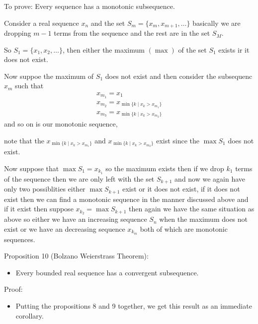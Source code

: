 \documentclass[12pt,a4paper]{article}
\begin{document}
\begin{tcolorbox}
    To prove: Every sequence has a monotonic subsequence.

    Consider a real sequence \(x_{n}\) and the set \(S_{m}=\{x_{m},x_{m+1},\ldots \} \) basically we are dropping \(m-1\) terms from the sequence and the rest are in the set \(S_{M}\).
    
    So \(S_{1}=\{x_{1},x_{2},\ldots \} \), then either the maximum \(\left( \max \right) \) of the set \(S_{1}\) exists ir it does not exist.
    
    Now suppoe the maximum of \(S_{1}\) does not exist and then consider the subsequenc \(x_{m}\) such that
     \begin{align*}
        x_{m_{1}}= x_{1}\\
        x_{m_{2}}= x_{\min \{k \mid x_{k} > x_{m_{1}}\}}\\
        x_{m_{3}}= x_{\min \{k \mid x_{k} > x_{m_{2}}\}}
    \end{align*}   
    and so on is our monotonic sequence,
    
    note that the \(x_{\min \{k \mid x_{k} > x_{m_{1}}\}}\) and \(x_{\min \{k \mid x_{k} > x_{m_{2}}\}}\)   exist since the \(\max S_{1} \) does not exist. 
    
    Now suppose that \(\max S_{1}=x_{k_{1}}\) so the maximum exists then if we drop \(k_{1}\) terms of the sequence then we are only left with the set \(S_{k+1}\) and now we again have only two possiblities either \(\max S_{k+1}\) exist or it does not exist, if it does not exist then we can find a monotonic sequence in the manner discussed above and if it exist then suppose \(x_{k_{2}}= \max S_{k+1}\) then again we have the same situation as above so either we have an increasing sequence \(S_{n}\) when the maximum does not exist or we have an decreasing sequence \(x_{k_{m}}\) both of which are monotonic sequences.  
\end{tcolorbox}

Proposition 10 (Bolzano Weierstrass Theorem):
\begin{itemize}
    \item Every bounded real sequence has a convergent subsequence.
\end{itemize}
Proof:
\begin{itemize}
    \item Putting the propositions 8 and 9 together, we get this result as an immediate corollary.
\end{itemize}
\end{document}
